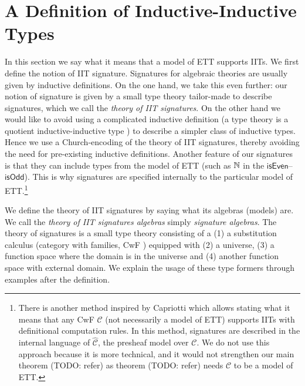 \documentclass[a4paper,UKenglish,cleveref, autoref]{lipics-v2019}
\begin{document}

\section{A Definition of Inductive-Inductive Types}
\label{sec:theory_of_signatures}

In this section we say what it means that a model of ETT supports
IITs. We first define the notion of IIT signature. Signatures for
algebraic theories are usually given by inductive definitions. On the
one hand, we take this even further: our notion of signature is given
by a small type theory tailor-made to describe signatures, which we call
 the \emph{theory of IIT signatures}. On the other hand we would
like to avoid using a complicated inductive definition (a type theory
is a quotient inductive-inductive type \cite{ttintt}) to describe a
simpler class of inductive types. Hence we use a Church-encoding
\cite{DBLP:conf/lics/AwodeyFS18} of the theory of IIT signatures, thereby
avoiding the need for pre-existing inductive definitions. Another
feature of our signatures is that they can include types from the
model of ETT (such as $\mathbb{N}$ in the
$\mathsf{isEven}$--$\mathsf{isOdd}$). This is why signatures are
specified internally to the particular model of ETT.\footnote{There is
  another method inspired by Capriotti \cite{paolo} which allows
  stating what it means that any CwF $\mathcal{C}$ (not necessarily a
  model of ETT) supports IITs with definitional computation rules. In
  this method, signatures are described in the internal language of
  $\hat{\mathcal{C}}$, the presheaf model over $\mathcal{C}$. We do not
  use this approach because it is more technical, and it would not
  strengthen our main theorem (TODO: refer) as theorem (TODO: refer)
  needs $\mathcal{C}$ to be a model of ETT.}

We define the theory of IIT signatures by saying what its algebras
(models) are. We call the \emph{theory of IIT signatures algebras}
simply \emph{signature algebras}. The theory of signatures is a small
type theory consisting of a (1) a substitution calculus (category with
families, CwF \cite{Dybjer96internaltype}) equipped with (2) a
universe, (3) a function space where the domain is in the universe and
(4) another function space with external domain. We explain the usage
of these type formers through examples after the definition.
\end{document}

